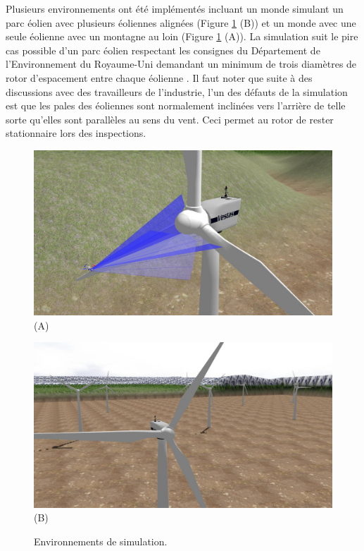 Plusieurs environnements ont été implémentés incluant un monde simulant un parc éolien avec plusieurs éoliennes alignées (Figure \ref{fig:sim_worlds} (B)) et un monde avec une seule éolienne avec un montagne au loin (Figure \ref{fig:sim_worlds} (A)). La simulation suit le pire cas possible d'un parc éolien respectant les consignes du Département de l'Environnement du Royaume-Uni demandant un minimum de trois diamètres de rotor d'espacement entre chaque éolienne \citep{DOE2009}. Il faut noter que suite à des discussions avec des travailleurs de l'industrie, l'un des défauts de la simulation est que les pales des éoliennes sont normalement inclinées vers l'arrière de telle sorte qu'elles sont parallèles au sens du vent. Ceci permet au rotor de rester stationnaire lors des inspections.

\begin{figure}[htbp]
  \centering
  \begin{minipage}{0.49\textwidth}
    \centering
    \includegraphics[width=\linewidth]{images/sim_vestas_closeup.jpg}
    (A)
  \end{minipage}
  \begin{minipage}{0.49\textwidth}
    \centering
    \includegraphics[width=\linewidth]{images/sim_vestas_multiple.jpg}
    (B)
  \end{minipage}
  \caption{Environnements de simulation.}
  \label{fig:sim_worlds}
\end{figure}

